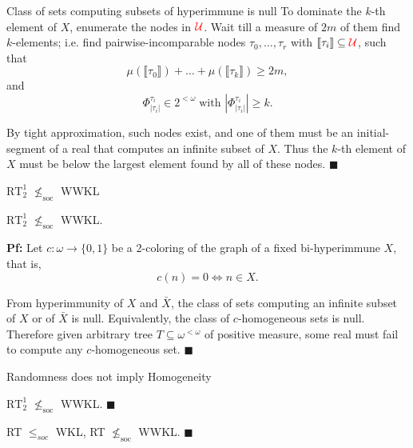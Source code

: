 \begin{frame}{Class of sets computing subsets of hyperimmune is null}
  To dominate the $k$-th element of $X$, enumerate the nodes in
  $\textcolor{red}{\mathcal{U}}$. Wait till a measure of $2m$ of them find
  $k$-elements; i.e. find pairwise-incomparable nodes
  $\tau_0,\ldots,\tau_r$ with $\llbracket\tau_i\rrbracket \subseteq
  \textcolor{red}{\mathcal{U}}$, such that
  \[\mu(\llbracket\tau_0\rrbracket) +\ldots
  +\mu(\llbracket\tau_k\rrbracket) \geq 2m,\]
  and
  \[\Phi^{\tau_i}_{|\tau_i|} \in 2^{<\omega}\; \text{with }
  |\Phi^{\tau_i}_{|\tau_i|}|\geq k.\]

  \vspace{2em}
  By tight approximation, such nodes exist, and one of them must be an
  initial-segment of a real that computes an infinite subset of $X$. Thus
  the $k$-th element of $X$ must be below the largest element found by all
  of these nodes. $\blacksquare$
\end{frame}

\begin{frame}{$\text{RT}_2^1$ $\nleq_{\text{soc}}$ WWKL}
  \begin{thm}
    $\text{RT}_2^1$ $\nleq_{\text{soc}}$ WWKL.
  \end{thm}

  \vspace{1em}
  \textbf{Pf:} Let $c:\omega\rightarrow\{0,1\}$ be a 2-coloring of the
  graph of a fixed bi-hyperimmune $X$, that is,
  \[c(n)=0 \Leftrightarrow n\in X.\]
  
  From hyperimmunity of $X$ and $\bar{X}$, the class of sets computing an
  infinite subset of $X$ or of $\bar{X}$ is null. Equivalently, the class
  of $c$-homogeneous sets is null. Therefore given arbitrary tree
  $T\subseteq\omega^{<\omega}$ of positive measure, some real must fail to
  compute any $c$-homogeneous set. $\blacksquare$
\end{frame}

\begin{frame}{Randomness does not imply Homogeneity}
  \begin{coro}
    $\text{RT}_2^1$ $\nleq_{\text{soc}}$ WWKL. $\blacksquare$
  \end{coro}
  \begin{coro}
    RT $\leq_{soc}$ WKL, RT $\nleq_{\text{soc}}$ WWKL. $\blacksquare$
  \end{coro}

  \vspace{1em}
  \begin{center}
  \end{center}
\end{frame}
